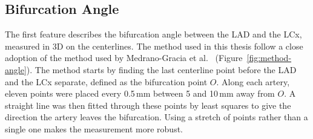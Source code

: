 \subsection{Bifurcation Angle}
\label{sec:method-angle}

The first feature describes the bifurcation angle between the LAD and the LCx, measured in 3D on the centerlines. The method used in this thesis follow a close adoption of the method used by Medrano-Gracia et al.\ \cite{medranogracia2016atlas} (Figure~\ref{fig:method-angle}).
The method starts by finding the last centerline point before the LAD and the LCx separate, defined as the bifurcation point $O$.
Along each artery, eleven points were placed every 0.5\,mm between 5 and 10\,mm away from $O$.
A straight line was then fitted through these points by least squares to give the direction the artery leaves the bifurcation. 
Using a stretch of points rather than a single one makes the measurement more robust.

